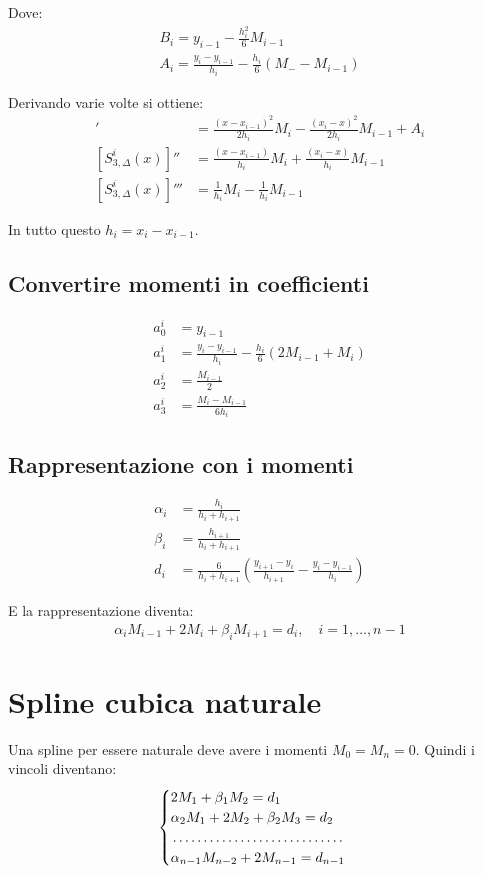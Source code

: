Dove:
\begin{align}
  B_i = y_{i-1} - \frac{h_i^2}{6} M_{i-1} \\
  A_i = \frac{y_i - y_{i-1}}{h_i} - \frac{h_i}{6}(M_- - M_{i-1})
\end{align}


Derivando varie volte si ottiene:
\begin{align}
  [S_{3, \Delta}^i(x)]' &= \frac{(x - x_{i-1})^2}{2h_i} M_i - \frac{(x_i -x)^2}{2h_i} M_{i-1} + A_i \\
  [S_{3, \Delta}^i(x)]'' &= \frac{(x - x_{i-1})}{h_i} M_i + \frac{(x_i -x)}{h_i} M_{i-1} \\
  [S_{3, \Delta}^i(x)]''' &= \frac{1}{h_i} M_i - \frac{1}{h_i} M_{i-1}
\end{align}

In tutto questo $h_i = x_i - x_{i-1}$.

\subsection{Convertire momenti in coefficienti}
\begin{align}
  a_0^i &= y_{i-1} \\
  a_1^i &= \frac{y_i - y_{i-1}}{h_i} - \frac{h_i}{6}(2M_{i-1} + M_i) \\
  a_2^i &= \frac{M_{i-1}}{2} \\
  a_3^i &= \frac{M_i - M_{i-1}}{6h_i}
\end{align}


\subsection{Rappresentazione con i momenti}
\begin{align}
  \alpha_i &= \frac{h_i}{h_i + h_{i+1}} \\
  \beta_i &= \frac{h_{i+1}}{h_i + h_{i+1}} \\
  d_i &= \frac{6}{h_i + h_{i+1}} \left( \frac{y_{i+1} - y_i}{h_{i+1}} - \frac{y_i - y_{i-1}}{h_i} \right)
\end{align}

E la rappresentazione diventa:
\begin{align}
  \alpha_i M_{i-1} + 2 M_i + \beta_i M_{i+1} = d_i, \quad i = 1, \dots, n-1
\end{align}

\section{Spline cubica naturale}
Una spline per essere naturale deve avere i momenti $M_0 = M_n = 0$.
Quindi i vincoli diventano:
\begin{align}
  \begin{cases}
    2 M_1 + \beta_1 M_2 = d_1 \\
    \alpha_2 M_1 + 2 M_2 + \beta_2 M_3 = d_2 \\
    \dotfill \\
    \alpha_{n-1} M_{n-2} + 2 M_{n-1} = d_{n-1}
  \end{cases}
\end{align}

